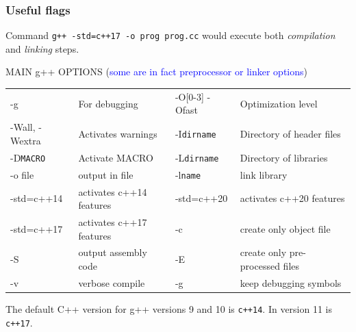 \documentclass[12pt,aspectratio=169]{beamer}
\begin{document}


\frame
{
\frametitle{Useful flags}

{\small
Command \alert{\texttt{g++ -std=c++17 -o prog prog.cc}} would execute both
\emph{compilation} and \emph{linking} steps.

{\scriptsize
\begin{center}
MAIN  g++ OPTIONS (\textcolor{blue}{some are in fact preprocessor or linker options})
\smallskip

\begin{tabular}{ll|ll}
  -g & For debugging & -O[0-3] -Ofast & Optimization level\\
  -Wall, -Wextra & Activates  warnings & -I\texttt{dirname}& Directory of header files\\
  -D\texttt{MACRO} & Activate MACRO & -L\texttt{dirname} & Directory of libraries\\ 
  -o file          & output in file & -l\texttt{name}  & link library\\
  -std=c++14 &activates c++14 features &-std=c++20 &activates c++20 features\\
  -std=c++17 &activates c++17 features &-c &create only object file\\
  -S & output assembly code &-E &create only pre-processed files\\
  -v & verbose compile & -g & keep debugging symbols\\
\end{tabular}
\end{center}
The default C++ version for g++ versions 9 and 10 is \texttt{c++14}. In version 11 is \texttt{c++17}.
}}
}
\end{document}
